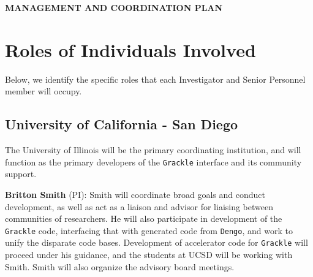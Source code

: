 \documentclass[11pt]{article}
\newcommand{\yt}{\texttt{yt}}
\newcommand{\grackle}{\texttt{Grackle}}
\newcommand{\dengo}{\texttt{Dengo}}
\begin{document}
\clearpage

%

\clearpage
{}
\setcounter{page}{1}

\begin{center}
  {\large \textbf{MANAGEMENT AND COORDINATION PLAN}}
\end{center}

\section{Roles of Individuals Involved}

Below, we identify the specific roles that each Investigator and Senior
Personnel member will occupy.

\subsection{University of California - San Diego}

The University of Illinois will be the primary coordinating institution, and
will function as the primary developers of the \grackle{} interface and its
community support.

\noindent \textbf{Britton Smith} (PI): Smith will coordinate broad goals
and conduct development, as well as act as a liaison and advisor for liaising
between communities of researchers.  He will also participate in development of
the \grackle{} code, interfacing that with generated code from \dengo{}, and
work to unify the disparate code bases.  Development of accelerator code for
\grackle{} will proceed under his guidance, and the students at UCSD will be
working with Smith.  Smith will also organize the advisory board meetings.
\end{document}
